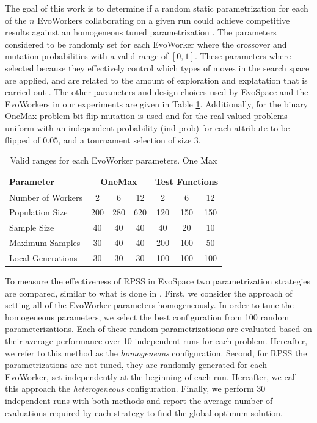 \documentclass{llncs}
\begin{document}
The goal of this work is to determine if a random static parametrization for each of the $n$ EvoWorkers 
collaborating on a given run could achieve competitive results against an homogeneous tuned parametrization
\cite{fuku1,fuku2,garcia2014randomized}. The parameters considered to be randomly set for each EvoWorker 
where the crossover and mutation probabilities with a valid range of $[0,1]$. These parameters where 
selected because they effectively control which types of moves in the search space are
applied, and are related to the amount of exploration and explatation that is carried out \cite{}.
The other parameters and design choices used by EvoSpace and the EvoWorkers in our experiments are given in 
Table \ref{tab:params}. Additionally, for the binary OneMax problem bit-flip mutation
is used and for the real-valued problems uniform with an 
independent probability (ind prob) for each attribute to be flipped of $0.05$, 
and a tournament selection of size 3.     %


\begin{table}[!t]
\caption{Valid ranges for each EvoWorker parameters. One Max}
\label{tab:params}
\centering
\begin{tabular}{|l|c|c|c|c|c|c| }
\hline
\textbf{Parameter} & \multicolumn{3}{|c|}{OneMax} & \multicolumn{3}{|c|}{Test Functions} \\
\hline
Number of Workers & 2 & 6 & 12 & 2 & 6 & 12\\
\hline
\hline
Population Size & 200 & 280 & 620 & 120 & 150 & 150\\
\hline
Sample Size & 40 & 40 & 40 & 40 & 20 & 10\\
\hline
Maximum Samples & 30 & 40 & 40 & 200 & 100 & 50\\
\hline
Local Generations & 30 & 30 & 30 & 100 & 100 & 100\\
\hline
\end{tabular}
\end{table}

To measure the effectiveness of RPSS in EvoSpace two parametrization strategies are compared, 
similar to what is done in \cite{fuku1,fuku2,garcia2014randomized}. First, we consider the approach of setting all 
of the EvoWorker parameters homogeneously. In order to tune the homogeneous parameters,
we select the best configuration from 100 random parameterizations. 
Each of these random parametrizations are evaluated based on their average performance over 10 
independent runs for each problem.
Hereafter, we refer to this method as the {\em homogeneous} configuration. Second, for RPSS the parametrizations
are not tuned, they are randomly generated for each EvoWorker, set independently at the beginning of each run.
Hereafter, we call this approach the {\em heterogeneous} configuration. Finally, we perform 30 independent runs
with both methods and report the average number of evaluations required by each strategy to find the
global optimum solution.
\end{document}
